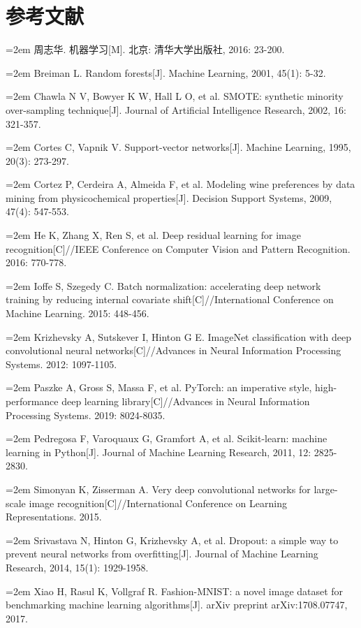\documentclass[12pt,a4paper,fontset=fandol]{ctexart}   %
\numberwithin{figure}{section}
\numberwithin{table}{section}
\numberwithin{equation}{section}
\begin{document}
\section*{参考文献}
{\setlength{\parindent}{0pt}
\newcommand{\refentry}[1]{\par\hangindent=2em #1\vspace{3pt}}
\refentry{周志华. 机器学习[M]. 北京: 清华大学出版社, 2016: 23-200.}
\refentry{Breiman L. Random forests[J]. Machine Learning, 2001, 45(1): 5-32.}
\refentry{Chawla N V, Bowyer K W, Hall L O, et al. SMOTE: synthetic minority over-sampling technique[J]. Journal of Artificial Intelligence Research, 2002, 16: 321-357.}
\refentry{Cortes C, Vapnik V. Support-vector networks[J]. Machine Learning, 1995, 20(3): 273-297.}
\refentry{Cortez P, Cerdeira A, Almeida F, et al. Modeling wine preferences by data mining from physicochemical properties[J]. Decision Support Systems, 2009, 47(4): 547-553.}
\refentry{He K, Zhang X, Ren S, et al. Deep residual learning for image recognition[C]//IEEE Conference on Computer Vision and Pattern Recognition. 2016: 770-778.}
\refentry{Ioffe S, Szegedy C. Batch normalization: accelerating deep network training by reducing internal covariate shift[C]//International Conference on Machine Learning. 2015: 448-456.}
\refentry{Krizhevsky A, Sutskever I, Hinton G E. ImageNet classification with deep convolutional neural networks[C]//Advances in Neural Information Processing Systems. 2012: 1097-1105.}
\refentry{Paszke A, Gross S, Massa F, et al. PyTorch: an imperative style, high-performance deep learning library[C]//Advances in Neural Information Processing Systems. 2019: 8024-8035.}
\refentry{Pedregosa F, Varoquaux G, Gramfort A, et al. Scikit-learn: machine learning in Python[J]. Journal of Machine Learning Research, 2011, 12: 2825-2830.}
\refentry{Simonyan K, Zisserman A. Very deep convolutional networks for large-scale image recognition[C]//International Conference on Learning Representations. 2015.}
\refentry{Srivastava N, Hinton G, Krizhevsky A, et al. Dropout: a simple way to prevent neural networks from overfitting[J]. Journal of Machine Learning Research, 2014, 15(1): 1929-1958.}
\refentry{Xiao H, Rasul K, Vollgraf R. Fashion-MNIST: a novel image dataset for benchmarking machine learning algorithms[J]. arXiv preprint arXiv:1708.07747, 2017.}
}
\end{document}
